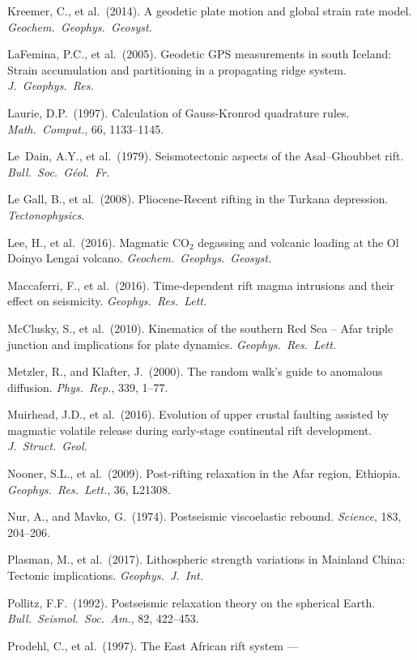 \documentclass[12pt]{article}
\begin{document}
\begin{description}
  \item Kreemer, C., et al.\ (2014). A geodetic plate motion and global strain
    rate model. \textit{Geochem.\ Geophys.\ Geosyst.}
  \item LaFemina, P.C., et al.\ (2005). Geodetic GPS measurements in south
    Iceland: Strain accumulation and partitioning in a propagating ridge system.
    \textit{J.\ Geophys.\ Res.}
  \item Laurie, D.P.\ (1997). Calculation of Gauss-Kronrod quadrature rules.
    \textit{Math.\ Comput.}, 66, 1133--1145.
  \item Le~Dain, A.Y., et al.\ (1979). Seismotectonic aspects of the
    Asal--Ghoubbet rift. \textit{Bull.\ Soc.\ G\'{e}ol.\ Fr.}
  \item Le Gall, B., et al.\ (2008). Pliocene-Recent rifting in the Turkana
    depression. \textit{Tectonophysics}.
  \item Lee, H., et al.\ (2016). Magmatic CO$_2$ degassing and volcanic
    loading at the Ol Doinyo Lengai volcano.
    \textit{Geochem.\ Geophys.\ Geosyst.}
  \item Maccaferri, F., et al.\ (2016). Time-dependent rift magma intrusions
    and their effect on seismicity. \textit{Geophys.\ Res.\ Lett.}
  \item McClusky, S., et al.\ (2010). Kinematics of the southern Red Sea --
    Afar triple junction and implications for plate dynamics.
    \textit{Geophys.\ Res.\ Lett.}
  \item Metzler, R., and Klafter, J.\ (2000). The random walk's guide to
    anomalous diffusion. \textit{Phys.\ Rep.}, 339, 1--77.
  \item Muirhead, J.D., et al.\ (2016). Evolution of upper crustal faulting
    assisted by magmatic volatile release during early-stage continental
    rift development. \textit{J.\ Struct.\ Geol.}
  \item Nooner, S.L., et al.\ (2009). Post-rifting relaxation in the Afar
    region, Ethiopia. \textit{Geophys.\ Res.\ Lett.}, 36, L21308.
  \item Nur, A., and Mavko, G.\ (1974). Postseismic viscoelastic rebound.
    \textit{Science}, 183, 204--206.
  \item Plasman, M., et al.\ (2017). Lithospheric strength variations in
    Mainland China: Tectonic implications. \textit{Geophys.\ J.\ Int.}
  \item Pollitz, F.F.\ (1992). Postseismic relaxation theory on the spherical
    Earth. \textit{Bull.\ Seismol.\ Soc.\ Am.}, 82, 422--453.
  \item Prodehl, C., et al.\ (1997). The East African rift system ---

\end{description}
\end{document}
